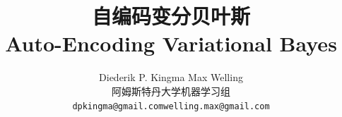 \title{\sffamily\bfseries\color{paperblue}自编码变分贝叶斯\\[0.4em]\large Auto-Encoding Variational Bayes}
\author{Diederik P. Kingma \qquad Max Welling\\
\normalsize 阿姆斯特丹大学机器学习组\\
\small\texttt{dpkingma@gmail.com}\quad\texttt{welling.max@gmail.com}}
\date{}
